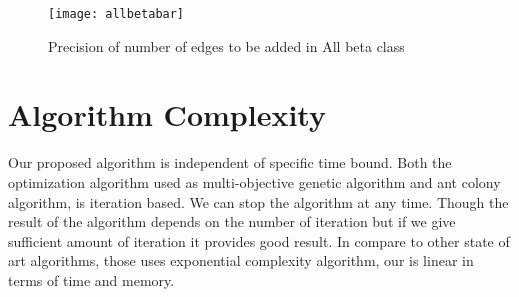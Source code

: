 \begin{figure}[h]
\centering
\texttt{[image: allbetabar]}
\caption{Precision of number of edges to be added in All beta class}
\label{fig:bar2}
\end{figure}
\section {Algorithm Complexity}
Our proposed algorithm is independent of specific time bound. Both the optimization algorithm used as multi-objective genetic algorithm and ant colony algorithm, is iteration based. We can stop the algorithm at any time. Though the result of the algorithm depends on the number of iteration but if we give sufficient amount of iteration it provides good result. In compare to other state of art algorithms, those uses exponential complexity algorithm, our is linear in terms of time and memory.
